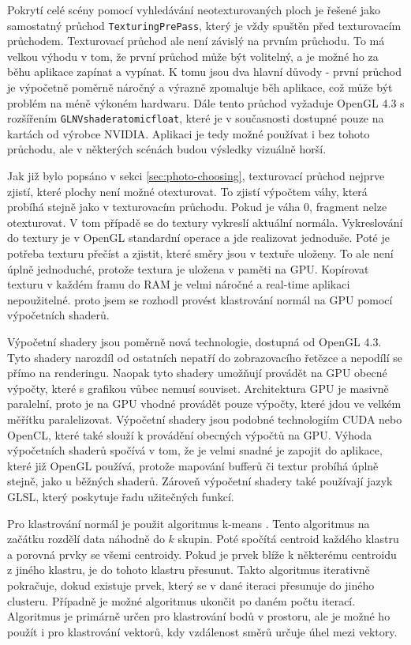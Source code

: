 \documentclass[11pt,twoside,a4paper]{book}
\begin{document}
Pokrytí celé scény pomocí vyhledávání neotexturovaných ploch je řešené jako samostatný průchod \texttt{TexturingPrePass}, který je vždy spuštěn před texturovacím průchodem. Texturovací průchod ale není závislý na prvním průchodu. To má velkou výhodu v tom, že první průchod může být volitelný, a je možné ho za běhu aplikace zapínat a vypínat. K tomu jsou dva hlavní důvody - první průchod je výpočetně poměrně náročný a výrazně zpomaluje běh aplikace, což může být problém na méně výkoném hardwaru. Dále tento průchod vyžaduje OpenGL 4.3 s rozšířením \texttt{GL\textunderscore NV\textunderscore shader\textunderscore atomic\textunderscore float}, které je v současnosti dostupné pouze na kartách od výrobce NVIDIA. Aplikaci je tedy možné používat i bez tohoto průchodu, ale v některých scénách budou výsledky vizuálně horší.

Jak již bylo popsáno v sekci \ref{sec:photo-choosing}, texturovací průchod nejprve zjistí, které plochy není možné otexturovat. To zjistí výpočtem váhy, která probíhá stejně jako v texturovacím průchodu. Pokud je váha 0, fragment nelze otexturovat. V tom případě se do textury vykreslí aktuální normála. Vykreslování do textury je v OpenGL standardní operace a jde realizovat jednoduše. Poté je potřeba texturu přečíst a zjistit, které směry jsou v textuře uloženy. To ale není úplně jednoduché, protože textura je uložena v paměti na GPU. Kopírovat texturu v každém framu do RAM je velmi náročné a real-time aplikaci nepoužitelné. proto jsem se rozhodl provést klastrování normál na GPU pomocí výpočetních shaderů.

Výpočetní shadery jsou poměrně nová technologie, dostupná od OpenGL 4.3. Tyto shadery narozdíl od ostatních nepatří do zobrazovacího řetězce a nepodílí se přímo na renderingu. Naopak tyto shadery umožňují provádět na GPU obecné výpočty, které s grafikou vůbec nemusí souviset. Architektura GPU je masivně paralelní, proto je na GPU vhodné provádět pouze výpočty, které jdou ve velkém měřítku paralelizovat. Výpočetní shadery jsou podobné technologiím CUDA nebo OpenCL, které také slouží k provádění obecných výpočtů na GPU. Výhoda výpočetních shaderů spočívá v tom, že je velmi snadné je zapojit do aplikace, které již OpenGL používá, protože mapování bufferů či textur probíhá úplně stejně, jako u běžných shaderů. Zároveň výpočetní shadery také používají jazyk GLSL, který poskytuje řadu užitečných funkcí. 

Pro klastrování normál je použit algoritmus k-means \cite{Lloyd82}. Tento algoritmus na začátku rozdělí data náhodně do $k$ skupin. Poté spočítá centroid každého klastru a porovná prvky se všemi centroidy. Pokud je prvek blíže k některému centroidu z jiného klastru, je do tohoto klastru přesunut. Takto algoritmus iterativně pokračuje, dokud existuje prvek, který se v dané iteraci přesunuje do jiného clusteru. Případně je možné algoritmus ukončit po daném počtu iterací. Algoritmus je primárně určen pro klastrování bodů v prostoru, ale je možné ho použít i pro klastrování vektorů, kdy vzdálenost směrů určuje úhel mezi vektory.
\end{document}
